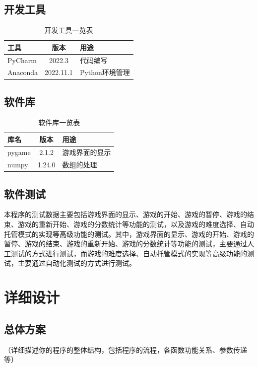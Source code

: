 \documentclass[UTF8,AutoFakeBold,AutoFakeSlant,zihao=-4]{ctexart}
\begin{document}
\subsection{开发工具}
\begin{table}[H]
  \centering
  \caption{开发工具一览表}
  \label{tab:dev-tool}
  \begin{tabular}{@{}lcl@{}}
    \toprule
    工具 & 版本 & 用途 \\ \midrule
    PyCharm & 2022.3 & 代码编写 \\ 
    Anaconda & 2022.11.1 & Python环境管理 \\ \bottomrule
  \end{tabular}
\end{table}



\subsection{软件库}
\begin{table}[H]
  \centering
  \caption{软件库一览表}
  \label{tab:soft-lib}
  \begin{tabular}{@{}lcl@{}}
    \toprule
    库名 & 版本 & 用途 \\ \midrule
    pygame & 2.1.2 & 游戏界面的显示 \\ 
    numpy & 1.24.0 & 数组的处理 \\
    \bottomrule
  \end{tabular}
\end{table}




\subsection{软件测试}
本程序的测试数据主要包括游戏界面的显示、游戏的开始、游戏的暂停、游戏的结束、游戏的重新开始、游戏的分数统计等功能的测试，以及游戏的难度选择、自动托管模式的实现等高级功能的测试。其中，游戏界面的显示、游戏的开始、游戏的暂停、游戏的结束、游戏的重新开始、游戏的分数统计等功能的测试，主要通过人工测试的方式进行测试，而游戏的难度选择、自动托管模式的实现等高级功能的测试，主要通过自动化测试的方式进行测试。
\clearpage

\section{详细设计}
\subsection{总体方案}
（详细描述你的程序的整体结构，包括程序的流程，各函数功能关系、参数传递等）
\end{document}
